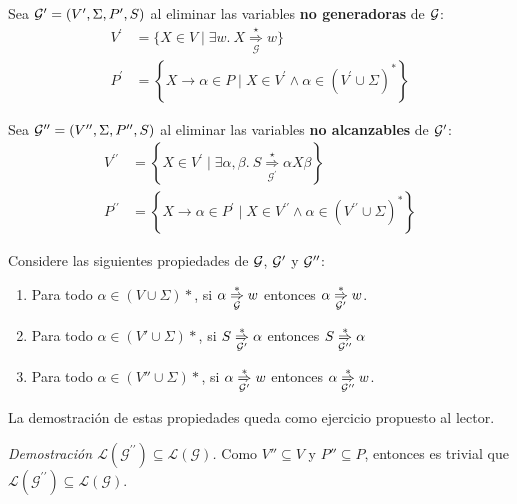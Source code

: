 Sea $\mathcal{G}' = (V', \Sigma, P', S)$ al eliminar las variables \textbf{no generadoras} de $\mathcal{G}$:
$$
    \begin{aligned}
        V^{\prime} & =\{X \in V \mid \exists w.\ X \underset{\mathcal{G}}{\stackrel{\star}{\Rightarrow}} w\}                                 \\
        P^{\prime} & =\left\{X \rightarrow \alpha \in P \mid X \in V^{\prime} \wedge \alpha \in\left(V^{\prime} \cup \Sigma\right)^*\right\}
    \end{aligned}
$$

Sea $\mathcal{G}'' = (V'', \Sigma, P'', S)$ al eliminar las variables \textbf{no alcanzables} de $\mathcal{G}'$:
$$
    \begin{aligned}
        V^{\prime \prime} & =\left\{X \in V^{\prime} \mid \exists \alpha, \beta.\ S \underset{\mathcal{G}^{\prime}}{\stackrel{\star}{\Rightarrow}} \alpha X \beta\right\}  \\
        P^{\prime \prime} & =\left\{X \rightarrow \alpha \in P^{\prime} \mid X \in V^{\prime \prime} \wedge \alpha \in\left(V^{\prime \prime} \cup \Sigma\right)^*\right\}
    \end{aligned}
$$

Considere las siguientes propiedades de $\mathcal{G}$, $\mathcal{G}'$ y $\mathcal{G}''$:
\begin{enumerate}
    \item Para todo $\alpha \in (V \cup \Sigma)*$, si $\alpha \underset{\mathcal{G}}{\overset{*}{\Rightarrow}} w$ entonces $\alpha \underset{\mathcal{G}'}{\overset{*}{\Rightarrow}} w$.

    \item Para todo $\alpha \in (V' \cup \Sigma)*$, si $S \underset{\mathcal{G}'}{\overset{*}{\Rightarrow}} \alpha$ entonces $S \underset{\mathcal{G}''}{\overset{*}{\Rightarrow}} \alpha$

    \item Para todo $\alpha \in (V'' \cup \Sigma)*$, si $\alpha \underset{\mathcal{G}'}{\overset{*}{\Rightarrow}} w$ entonces $\alpha \underset{\mathcal{G}''}{\overset{*}{\Rightarrow}} w$.
\end{enumerate}

La demostración de estas propiedades queda como ejercicio propuesto al lector. \bigbreak

\textit{Demostración $\mathcal{L}\left(\mathcal{G}^{\prime \prime}\right) \subseteq \mathcal{L}(\mathcal{G})$.} Como $V'' \subseteq V$ y $P'' \subseteq P$, entonces es trivial que $\mathcal{L}\left(\mathcal{G}^{\prime \prime}\right) \subseteq \mathcal{L}(\mathcal{G})$. \bigbreak


